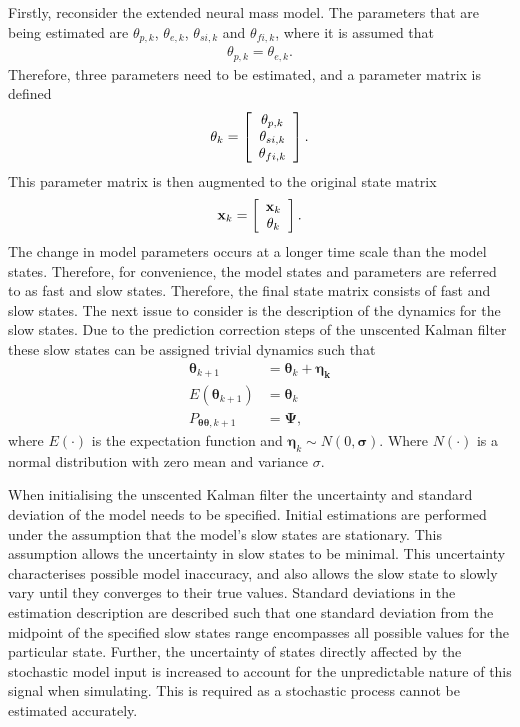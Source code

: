 Firstly, reconsider the extended neural mass model. The parameters that are being estimated are $\theta_{p,k}$, $\theta_{e,k}$, $\theta_{si,k}$ and $\theta_{fi,k}$, where it is assumed that \begin{align}
\theta_{p,k} = \theta_{e,k}.
\end{align} Therefore, three parameters need to be estimated, and a parameter matrix is defined
\[ \mathbf{\theta}_{k} = \left[ \begin{array}[pos]{c}
\theta_{p,k}\\
\theta_{si,k} \\
\theta_{fi,k} \end{array} \right] .\] This parameter matrix is then augmented to the original state matrix
\[ \mathbf{x}_{k} = \left[ \begin{array}[pos]{c}
\mathbf{x}_{k}\\
\mathbf{\theta}_{k} \end{array} \right] .\] The change in model parameters occurs at a longer time scale than the model states. Therefore, for convenience, the model states and parameters are referred to as fast and slow states. Therefore, the final state matrix consists of fast and slow states. The next issue to consider is the description of the dynamics for the slow states. Due to the prediction correction steps of the unscented Kalman filter these slow states can be assigned trivial dynamics such that
\begin{align}
\label{eqn: parameterdynamics}
\mathbf{\theta}_{k+1} &= \mathbf{\theta}_{k} + \mathbf{\eta_{k}}\\
E(\mathbf{\theta}_{k+1}) &= \mathbf{\theta}_{k}\\
P_{\mathbf{\theta} \mathbf{\theta},k+1} &= \mathbf{\Psi},
\end{align} where $E(\cdot)$ is the expectation function and $\mathbf{\eta}_{k} \sim N(0,\mathbf{\sigma})$. Where $N(\cdot)$ is a normal distribution with zero mean and variance $\sigma$.

When initialising the unscented Kalman filter the uncertainty and standard deviation of the model needs to be specified. Initial estimations are performed under the assumption that the model's slow states are stationary. This assumption allows the uncertainty in slow states to be minimal. This uncertainty characterises possible model inaccuracy, and also allows the slow state to slowly vary until they converges to their true values. Standard deviations in the estimation description are described such that one standard deviation from the midpoint of the specified slow states range encompasses all possible values for the particular state. Further, the uncertainty of states directly affected by the stochastic model input is increased to account for the unpredictable nature of this signal when simulating. This is required as a stochastic process cannot be estimated accurately. 

